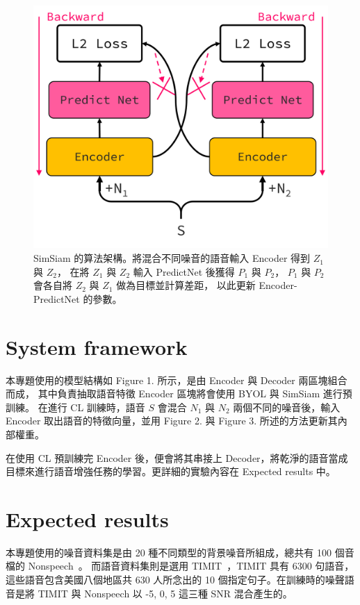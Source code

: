 \documentclass[10pt,twocolumn,letterpaper]{article}
\begin{document}
\begin{CJK}{UTF8}{bkai}
   \begin{figure}[t]
      \begin{center}
         \includegraphics[width=1\linewidth]{img/SimSiam.png}
      \end{center}
      \caption{
         SimSiam 的算法架構。將混合不同噪音的語音輸入 Encoder 得到 $Z_1$ 與 $Z_2$，
         在將 $Z_1$ 與 $Z_2$ 輸入 PredictNet 後獲得 $P_1$ 與 $P_2$，
         $P_1$ 與 $P_2$ 會各自將 $Z_2$ 與 $Z_1$ 做為目標並計算差距，
         以此更新 Encoder-PredictNet 的參數。
      }
      \label{fig:long}
      \label{fig:onecol}
   \end{figure}
   \section{System framework}
   本專題使用的模型結構如 Figure 1. 所示，是由 Encoder 與 Decoder 兩區塊組合而成，
   其中負責抽取語音特徵 Encoder 區塊將會使用 BYOL 與 SimSiam 進行預訓練。
   在進行 CL 訓練時，語音 $S$ 會混合 $N_1$ 與 $N_2$ 兩個不同的噪音後，輸入 Encoder
   取出語音的特徵向量，並用 Figure 2. 與 Figure 3. 所述的方法更新其內部權重。

   在使用 CL 預訓練完 Encoder 後，便會將其串接上
   Decoder，將乾淨的語音當成目標來進行語音增強任務的學習。更詳細的實驗內容在 Expected results 中。


   \section{Expected results}
   本專題使用的噪音資料集是由 20 種不同類型的背景噪音所組成，總共有 100 個音檔的 Nonspeech~\cite{Nonspeech}。
   而語音資料集則是選用 TIMIT~\cite{TIMIT}，TIMIT 具有 6300 句語音，這些語音包含美國八個地區共 630 人所念出的 10
   個指定句子。在訓練時的噪聲語音是將 TIMIT 與 Nonspeech 以 -5, 0, 5 這三種 SNR 混合產生的。



\end{CJK}
\end{document}
